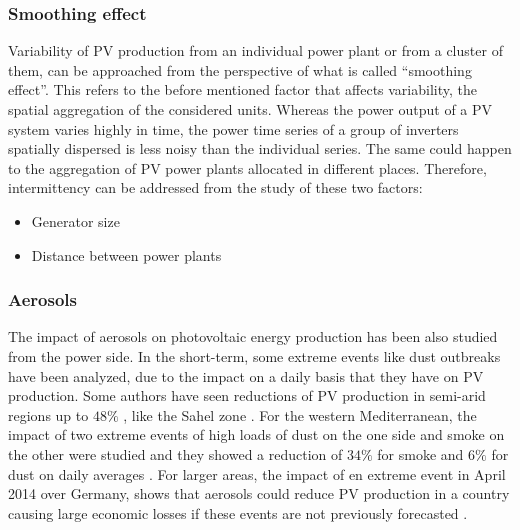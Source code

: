 \subsubsection{Smoothing effect}

Variability of PV production from an individual power plant or from a cluster of them, can be approached from the perspective of what is called ``smoothing effect''. This refers to the before mentioned factor that affects variability, the spatial aggregation of the considered units. Whereas the power output of a PV system varies highly in time, the power time series of a group of inverters spatially dispersed is less noisy than the individual series. The same could happen to the aggregation of PV power plants allocated in different places. Therefore, intermittency can be addressed from the study of these two factors:

\begin{itemize}
\item{Generator size}
\item{Distance between power plants}
\end{itemize}

\subsubsection{Aerosols}

The impact of aerosols on photovoltaic energy production has been also studied from the power side. In the short-term, some extreme events like dust outbreaks have been analyzed, due to the impact on a daily basis that they have on PV production. Some authors have seen reductions of PV production in semi-arid regions up to $48\%$ , like the Sahel zone \cite*{Neher2017}. For the western Mediterranean, the impact of two extreme events of high loads of dust on the one side and smoke on the other were studied and they showed a reduction of $34\%$ for smoke and $6\%$ for dust on daily averages \cite*{Gomez-Amo2019}. For larger areas, the impact of en extreme event in April 2014 over Germany, shows that aerosols could reduce PV production in a country causing large economic losses if these events are not previously forecasted \cite*{Rieger2017}.


